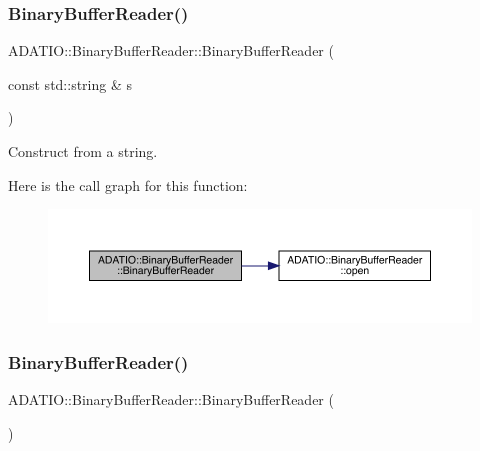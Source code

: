 \subsubsection{\texorpdfstring{BinaryBufferReader()}{BinaryBufferReader()}\hspace{0.1cm}{\footnotesize\ttfamily [2/6]}}
{\footnotesize\ttfamily A\+D\+A\+T\+I\+O\+::\+Binary\+Buffer\+Reader\+::\+Binary\+Buffer\+Reader (\begin{DoxyParamCaption}\item[{const std\+::string \&}]{s }\end{DoxyParamCaption})\hspace{0.3cm}{\ttfamily [explicit]}}



Construct from a string. 

Here is the call graph for this function\+:\nopagebreak
\begin{figure}[H]
\begin{center}
\leavevmode
\includegraphics[width=350pt]{d0/df3/classADATIO_1_1BinaryBufferReader_af3ef435054f2f29a596ca4b45b3642e5_cgraph}
\end{center}
\end{figure}
\mbox{\label{classADATIO_1_1BinaryBufferReader_a9bb5e29231fc81acbe7f0e6ab2720f6c}} 
\subsubsection{\texorpdfstring{BinaryBufferReader()}{BinaryBufferReader()}\hspace{0.1cm}{\footnotesize\ttfamily [3/6]}}
{\footnotesize\ttfamily A\+D\+A\+T\+I\+O\+::\+Binary\+Buffer\+Reader\+::\+Binary\+Buffer\+Reader (\begin{DoxyParamCaption}{ }\end{DoxyParamCaption})}

\mbox{\label{classADATIO_1_1BinaryBufferReader_ab890177a0ac7f1e191ebd15d148fc48b}} 
